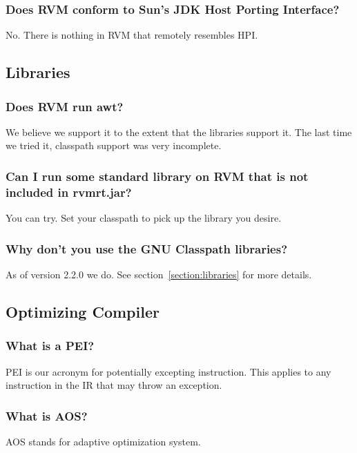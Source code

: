 \subsubsection{Does RVM conform to Sun's JDK Host Porting Interface?}

No. There is nothing in RVM that remotely resembles HPI.

\JavaTMFooter

\AIXPPCTMFooter

\subsection{Libraries}

\subsubsection{Does RVM run awt?}

We believe we support it to the extent that the 
libraries support it. The last time we tried it, classpath support was
very incomplete. 

\subsubsection{Can I run some standard library on RVM that is not included
in rvmrt.jar?}

You can try.  Set your classpath to pick up the library you desire.

\subsubsection{Why don't you use the GNU Classpath libraries?}

As of version 2.2.0 we do. See section~\ref{section:libraries} for more
details. 

\subsection{Optimizing Compiler}

\subsubsection{What is a PEI?}
PEI is our acronym for potentially excepting instruction.  This applies to
any instruction in the IR that may throw an exception.

\subsubsection{What is AOS?}
AOS stands for adaptive optimization system.

